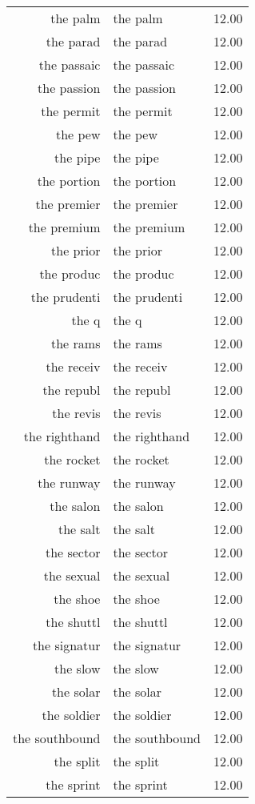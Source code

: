 \begin{table}[ht]
\begin{tabular}{rlr}
  the palm & the palm & 12.00 \\ 
  the parad & the parad & 12.00 \\ 
  the passaic & the passaic & 12.00 \\ 
  the passion & the passion & 12.00 \\ 
  the permit & the permit & 12.00 \\ 
  the pew & the pew & 12.00 \\ 
  the pipe & the pipe & 12.00 \\ 
  the portion & the portion & 12.00 \\ 
  the premier & the premier & 12.00 \\ 
  the premium & the premium & 12.00 \\ 
  the prior & the prior & 12.00 \\ 
  the produc & the produc & 12.00 \\ 
  the prudenti & the prudenti & 12.00 \\ 
  the q & the q & 12.00 \\ 
  the rams & the rams & 12.00 \\ 
  the receiv & the receiv & 12.00 \\ 
  the republ & the republ & 12.00 \\ 
  the revis & the revis & 12.00 \\ 
  the righthand & the righthand & 12.00 \\ 
  the rocket & the rocket & 12.00 \\ 
  the runway & the runway & 12.00 \\ 
  the salon & the salon & 12.00 \\ 
  the salt & the salt & 12.00 \\ 
  the sector & the sector & 12.00 \\ 
  the sexual & the sexual & 12.00 \\ 
  the shoe & the shoe & 12.00 \\ 
  the shuttl & the shuttl & 12.00 \\ 
  the signatur & the signatur & 12.00 \\ 
  the slow & the slow & 12.00 \\ 
  the solar & the solar & 12.00 \\ 
  the soldier & the soldier & 12.00 \\ 
  the southbound & the southbound & 12.00 \\ 
  the split & the split & 12.00 \\ 
  the sprint & the sprint & 12.00 \\ 

\end{tabular}
\end{table}
